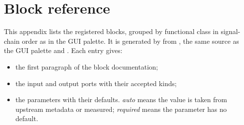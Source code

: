 \chapter{Block reference}\label{app:blocks}

This appendix lists the \numblocks{} registered blocks, grouped by functional class in signal-chain order as in the GUI palette. It is generated by
 from , the same source as the GUI
palette and . Each entry gives:
\begin{itemize}
  \item the first paragraph of the block documentation;
  \item the input and output ports with their accepted kinds;
  \item the parameters with their defaults. \emph{auto} means the value is taken from upstream
  metadata or measured; \emph{required} means the parameter has no default.
\end{itemize}

\makeatletter
\newcommand{\blockcategory}[1]{%
  \section{\texorpdfstring{\MakeUppercase{#1}}{#1}}}
\newcommand{\blockentry}[5]{%
  \par\noindent
  \begin{minipage}{\linewidth}\raggedright
    {\sffamily\bfseries\color{accent}\texttt{#1}}\quad{\small #2}\\[1pt]
    {\footnotesize\textsf{in:} \texttt{#3}\qquad\textsf{out:} \texttt{#4}}\\[1pt]
    {\footnotesize\color{commentcolor}#5}
  \end{minipage}\par\vspace{5pt}}
\makeatother


